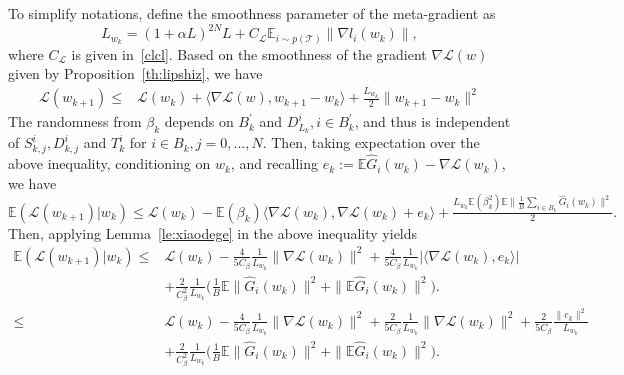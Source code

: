\documentclass{osudissert96}
\begin{document}
To simplify notations, define the smoothness parameter of the meta-gradient as $$L_{w_k} = (1+\alpha L)^{2N}L + C_\mathcal{L} \mathbb{E}_{i\sim p(\mathcal{T})}\|\nabla l_i(w_k)\|,$$ where $C_\mathcal{L}$ is given in~\cref{clcl}. 	
Based on the smoothness of the gradient $\nabla \mathcal{L}(w) $ given by Proposition~\ref{th:lipshiz}, we have 
	\begin{align*}
	\mathcal{L}(w_{k+1}) \leq & \mathcal{L}(w_k) + \langle  \nabla \mathcal{L}(w)  , w_{k+1} - w_{k}    \rangle + \frac{L_{w_k}}{2} \|w_{k+1}-w_{k}\|^2 \nonumber
	\end{align*}
	The randomness from $\beta_k$ depends on $B_k^\prime$ and $D_{L_k}^i, i \in B_k^{\prime}$, and thus is independent of $S_{k,j}^i, D_{k,j}^i$ and $T_k^i$ for $i\in B_k, j=0,...,N$. Then,  taking expectation over the above inequality, conditioning on $w_k$, and recalling $e_k := \mathbb{E}\widehat G_i(w_k) - \nabla \mathcal{L}(w_k) $, we have  
	$\mathbb{E}( \mathcal{L}(w_{k+1})| w_k) \leq \mathcal{L}(w_{k}) - \mathbb{E} (\beta_k)\langle \nabla \mathcal{L}(w_{k}), \nabla \mathcal{L}(w_{k}) + e_k\rangle+\frac{L_{w_k}\mathbb{E} (\beta^2_k)\mathbb{E} \big\|  \frac{1}{B} \sum_{i\in B_k} \widehat G_i(w_k) \big \|^2}{2}.$ %
Then, applying Lemma~\ref{le:xiaodege} in the above inequality yields
	\begin{align}\label{qiangxing}
	\mathbb{E}( \mathcal{L}(w_{k+1})| w_k)
	\leq & \mathcal{L}(w_{k}) -\frac{4}{5C_\beta} \frac{1}{ L_{w_k}}  \|\nabla \mathcal{L}(w_{k})\|^2+ \frac{4}{5C_\beta} \frac{1}{ L_{w_k}} |\langle \nabla \mathcal{L}(w_{k}), e_k\rangle|  \nonumber
	\\ &+ \frac{2}{C_\beta^2} \frac{1}{L_{w_k}} \Big( \frac{1}{B}\mathbb{E}  \big\|   \widehat G_i(w_k) \big \|^2  +    \|\mathbb{E}  \widehat G_i(w_k)\|^2\Big).\nonumber
	\\\leq & \mathcal{L}(w_{k}) -\frac{4}{5C_\beta} \frac{1}{ L_{w_k}}  \|\nabla \mathcal{L}(w_{k})\|^2+ \frac{2}{5C_\beta} \frac{1}{ L_{w_k}} \| \nabla \mathcal{L}(w_{k})\|^2 +  \frac{2}{5C_\beta} \frac{\| e_k\|^2 }{ L_{w_k}} \nonumber
	\\ &+ \frac{2}{C_\beta^2} \frac{1}{L_{w_k}} \Big( \frac{1}{B}\mathbb{E}  \big\|   \widehat G_i(w_k) \big \|^2  +    \|\mathbb{E}  \widehat G_i(w_k)\|^2\Big).
	\end{align}
\end{document}
